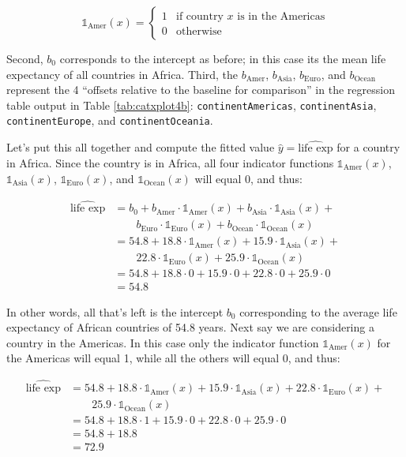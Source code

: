 \documentclass[12pt, krantz2,]{krantz}
\begin{document}
\[
\mathbb{1}_{\mbox{Amer}}(x) = \left\{
\begin{array}{ll}
1 & \text{if } \text{country } x \text{ is in the Americas} \\
0 & \text{otherwise}\end{array}
\right.
\]

Second, \(b_0\) corresponds to the intercept as before; in this case its the mean life expectancy of all countries in Africa. Third, the \(b_{\text{Amer}}\), \(b_{\text{Asia}}\), \(b_{\text{Euro}}\), and \(b_{\text{Ocean}}\) represent the 4 ``offsets relative to the baseline for comparison'' in the regression table output in Table \ref{tab:catxplot4b}: \texttt{continentAmericas}, \texttt{continentAsia}, \texttt{continentEurope}, and \texttt{continentOceania}.

Let's put this all together and compute the fitted value \(\widehat{y} = \widehat{\text{life exp}}\) for a country in Africa. Since the country is in Africa, all four indicator functions \(\mathbb{1}_{\mbox{Amer}}(x)\), \(\mathbb{1}_{\mbox{Asia}}(x)\), \(\mathbb{1}_{\mbox{Euro}}(x)\), and \(\mathbb{1}_{\mbox{Ocean}}(x)\) will equal 0, and thus:

\[
\begin{aligned}
\widehat{\text{life exp}} &= b_0 + b_{\text{Amer}}\cdot\mathbb{1}_{\mbox{Amer}}(x) + b_{\text{Asia}}\cdot\mathbb{1}_{\mbox{Asia}}(x)
+ \\
& \qquad b_{\text{Euro}}\cdot\mathbb{1}_{\text{Euro}}(x) + b_{\text{Ocean}}\cdot\mathbb{1}_{\text{Ocean}}(x)\\
&= 54.8 + 18.8\cdot\mathbb{1}_{\text{Amer}}(x) + 15.9\cdot\mathbb{1}_{\text{Asia}}(x)
+ \\
& \qquad 22.8\cdot\mathbb{1}_{\text{Euro}}(x) + 25.9\cdot\mathbb{1}_{\text{Ocean}}(x)\\
&= 54.8 + 18.8\cdot 0 + 15.9\cdot 0 + 22.8\cdot 0 + 25.9\cdot 0\\
&= 54.8
\end{aligned}
\]

In other words, all that's left is the intercept \(b_0\) corresponding to the average life expectancy of African countries of 54.8 years. Next say we are considering a country in the Americas. In this case only the indicator function \(\mathbb{1}_{\mbox{Amer}}(x)\) for the Americas will equal 1, while all the others will equal 0, and thus:

\[
\begin{aligned}
\widehat{\text{life exp}} &= 54.8 + 18.8\cdot\mathbb{1}_{\mbox{Amer}}(x) + 15.9\cdot\mathbb{1}_{\mbox{Asia}}(x)
+ 22.8\cdot\mathbb{1}_{\mbox{Euro}}(x) + \\
& \qquad 25.9\cdot\mathbb{1}_{\mbox{Ocean}}(x)\\
&= 54.8 + 18.8\cdot 1 + 15.9\cdot 0 + 22.8\cdot 0 + 25.9\cdot 0\\
&= 54.8 + 18.8\\
&= 72.9
\end{aligned}
\]
\end{document}
